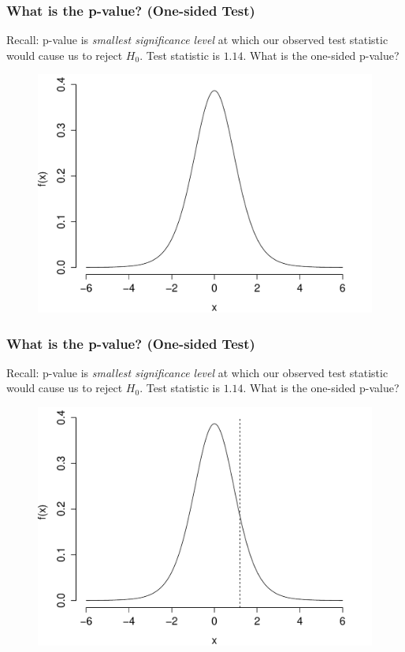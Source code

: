 \begin{frame}
\frametitle{What is the p-value? (One-sided Test)}
\footnotesize
Recall: p-value is \emph{smallest significance level} at which our observed test statistic would cause us to reject $H_0$. \alert{Test statistic is $1.14$. What is the one-sided p-value? }
\begin{figure}
\includegraphics[scale= 0.4]{./images/p_upper1}

\end{figure}

\end{frame}

\begin{frame}
\frametitle{What is the p-value? (One-sided Test)}
\footnotesize
Recall: p-value is \emph{smallest significance level} at which our observed test statistic would cause us to reject $H_0$. \alert{Test statistic is $1.14$. What is the one-sided p-value? }
\begin{figure}
\includegraphics[scale= 0.4]{./images/p_upper2}

\end{figure}

\end{frame}

